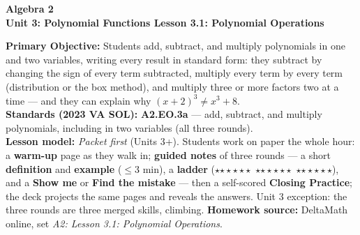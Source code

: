 \documentclass[10pt]{article}
\newcommand{\CourseName}{Algebra 2}
\newcommand{\UnitNumberName}{Unit 3: Polynomial Functions \quad}
\newcommand{\LessonNumberName}{Lesson 3.1: Polynomial Operations}
\newcommand{\rung}[1]{{\color{goldacc}\ifcase#1\or$\star$\or$\star\star$\or$\star\star\star$\fi}}
\begin{document}
\begin{center}
    {\Large\bfseries \CourseName \\
    {\small\bfseries \UnitNumberName \LessonNumberName}}
\end{center}

\begin{tcolorbox}[colback=forestbg, colframe=forest, boxrule=0.9pt, arc=2mm,
    left=2mm, right=2mm, top=1.5mm, bottom=1.5mm]
    \textbf{Primary Objective:} Students add, subtract, and multiply polynomials in one and two
    variables, writing every result in standard form: they subtract by changing the sign of every
    term subtracted, multiply every term by every term (distribution or the box method), and
    multiply three or more factors two at a time --- and they can explain why $(x+2)^3\ne x^3+8$.
    \\[2pt]
    \textbf{Standards (2023 VA SOL):} \textbf{A2.EO.3a} --- add, subtract, and multiply
    polynomials, including in two variables (all three rounds).
    \\[2pt]
    \textbf{Lesson model:} \emph{Packet first} (Units 3+). Students work on paper the whole hour:
    a \textbf{warm-up} page as they walk in; \textbf{guided notes} of three rounds --- a short
    \textbf{definition} and \textbf{example} ($\le$3 min), a \textbf{ladder} (\rung1\ \rung2\
    \rung3), and a \textbf{Show me} or \textbf{Find the mistake} --- then a self-scored
    \textbf{Closing Practice}; the deck projects the same pages and reveals the answers. Unit 3
    exception: the three rounds are three merged skills, climbing. \textbf{Homework source:}
    DeltaMath online, set \emph{A2: Lesson 3.1: Polynomial Operations}.
\end{tcolorbox}
\end{document}
